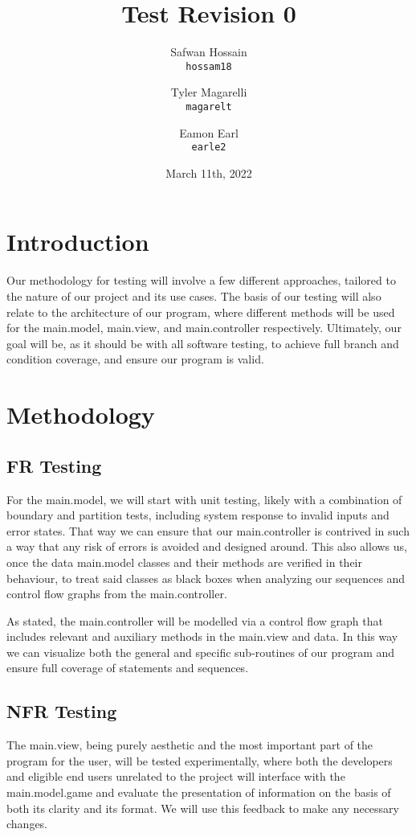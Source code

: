 \documentclass{article}
\title{Test Revision 0}
\author{
  Safwan Hossain\\
  \texttt{hossam18}\\
  \and
  Tyler Magarelli\\
  \texttt{magarelt}\\
  \and
  Eamon Earl\\
  \texttt{earle2}
}
\date{March 11th, 2022}
\begin{document}
\maketitle

\section{Introduction}

Our methodology for testing will involve a few different approaches, tailored to the nature of our project and its use cases. The basis of our testing will also relate to the architecture of our program, where different methods will be used for the main.model, main.view, and main.controller respectively. Ultimately, our goal will be, as it should be with all software testing, to achieve full branch and condition coverage, and ensure our program is valid.

\section{Methodology}

\subsection{FR Testing}

For the main.model, we will start with unit testing, likely with a combination of boundary and partition tests, including system response to invalid inputs and error states. That way we can ensure that our main.controller is contrived in such a way that any risk of errors is avoided and designed around. This also allows us, once the data main.model classes and their methods are verified in their behaviour, to treat said classes as black boxes when analyzing our sequences and control flow graphs from the main.controller.

As stated, the main.controller will be modelled via a control flow graph that includes relevant and auxiliary methods in the main.view and data. In this way we can visualize both the general and specific sub-routines of our program and ensure full coverage of statements and sequences.

\subsection{NFR Testing}

The main.view, being purely aesthetic and the most important part of the program for the user, will be tested experimentally, where both the developers and eligible end users unrelated to the project will interface with the main.model.game and evaluate the presentation of information on the basis of both its clarity and its format. We will use this feedback to make any necessary changes.
\end{document}
